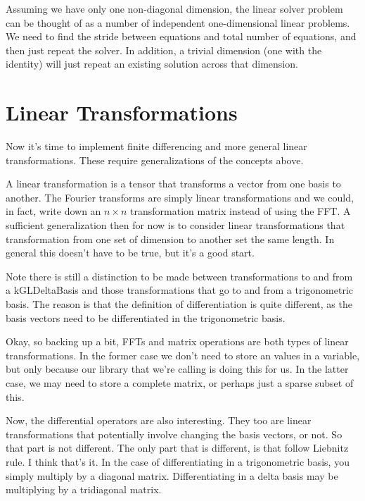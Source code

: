 \documentclass[11pt]{article}
\begin{document}
Assuming we have only one non-diagonal dimension, the linear solver problem can be thought of as a number of independent one-dimensional linear problems. We need to find the stride between equations and total number of equations, and then just repeat the solver. In addition, a trivial dimension (one with the identity) will just repeat an existing solution across that dimension.

%
%

\section{Linear Transformations}

Now it's time to implement finite differencing and more general linear transformations. These require generalizations of the concepts above.

A linear transformation is a tensor that transforms a vector from one basis to another. The Fourier transforms are simply linear transformations and we could, in fact, write down an $n \times n$ transformation matrix instead of using the FFT. A sufficient generalization then for now is to consider linear transformations that transformation from one set of dimension to another set the same length. In general this doesn't have to be true, but it's a good start.

Note there is still a distinction to be made between transformations to and from a kGLDeltaBasis and those transformations that go to and from a trigonometric basis. The reason is that the definition of differentiation is quite different, as the basis vectors need to be differentiated in the trigonometric basis.

Okay, so backing up a bit, FFTs and matrix operations are both types of linear transformations. In the former case we don't need to store an values in a variable, but only because our library that we're calling is doing this for us. In the latter case, we may need to store a complete matrix, or perhaps just a sparse subset of this.

Now, the differential operators are also interesting. They too are linear transformations that potentially involve changing the basis vectors, or not. So that part is not different. The only part that is different, is that follow Liebnitz rule. I think that's it. In the case of differentiating in a trigonometric basis, you simply multiply by a diagonal matrix. Differentiating in a delta basis may be multiplying by a tridiagonal matrix.
\end{document}
